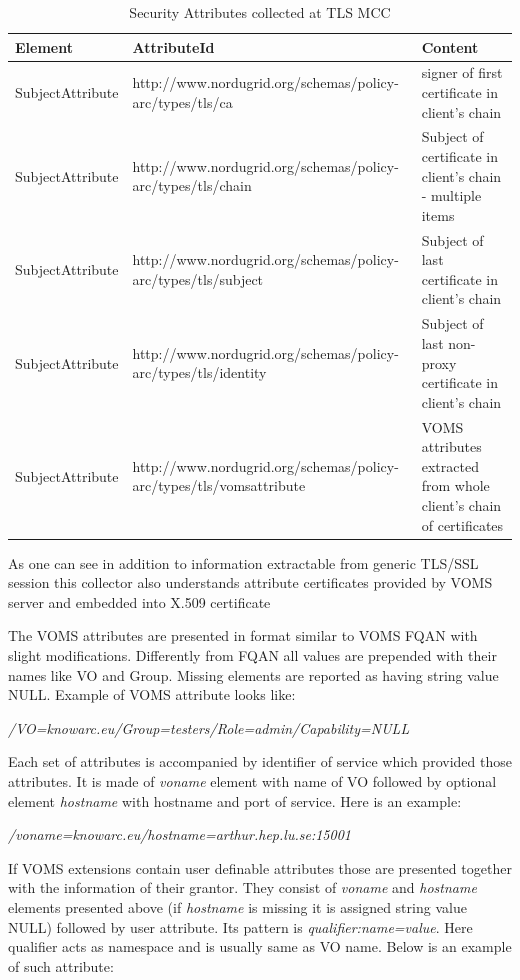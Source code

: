 \documentclass{article}                            %
\begin{document}
\begin{table}[h]
\caption{Security Attributes collected at TLS MCC}
\centering
\begin{tabular}{| l | p{7cm} | p{5cm} |}
\hline
\textbf{Element} & \textbf{AttributeId} & \textbf{Content} \\ \hline
SubjectAttribute & http://www.nordugrid.org/schemas/policy-arc/types/tls/ca & signer of first certificate in client's chain
 \\ \hline
SubjectAttribute & http://www.nordugrid.org/schemas/policy-arc/types/tls/chain & Subject of certificate in client's chain - multiple items \\ \hline
SubjectAttribute & http://www.nordugrid.org/schemas/policy-arc/types/tls/subject & Subject of last certificate in client's chain \\ \hline
SubjectAttribute & http://www.nordugrid.org/schemas/policy-arc/types/tls/identity & Subject of last non-proxy certificate in client's chain \\ \hline
SubjectAttribute & http://www.nordugrid.org/schemas/policy-arc/types/tls/vomsattribute & VOMS attributes extracted from whole client's chain of certificates \\ \hline
\end{tabular}
\label{table:tls_attr}
\end{table}

As one can see in addition to information extractable from generic TLS/SSL session this collector also understands attribute certificates provided by VOMS server and embedded into X.509 certificate

The VOMS attributes are presented in format similar to VOMS FQAN with slight modifications. Differently from FQAN all values are prepended with their names like VO and Group. Missing elements are reported as having string value NULL. Example of VOMS attribute looks like:

\emph{/VO=knowarc.eu/Group=testers/Role=admin/Capability=NULL}

Each set of attributes is accompanied by identifier of service which provided those attributes. It is made of \textit{voname} element with name of VO followed by optional element \textit{hostname} with hostname and port of service. Here is an example:

\emph{/voname=knowarc.eu/hostname=arthur.hep.lu.se:15001}

If VOMS extensions contain user definable attributes those are presented together with the information of their grantor. They consist of \textit{voname} and \textit{hostname} elements presented above (if \textit{hostname} is missing it is assigned string value NULL) followed by user attribute. Its pattern is \textit{qualifier:name=value}. Here qualifier acts as namespace and is usually same as VO name. Below is an example of such attribute:
\end{document}

